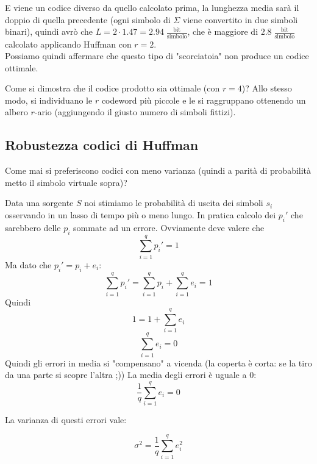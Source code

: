 E viene un codice diverso da quello calcolato prima, la lunghezza media sarà il doppio di quella precedente (ogni simbolo di $\Sigma$ viene convertito in due simboli binari), quindi avrò che $L = 2 \cdot 1.47 = 2.94 \; \frac{\text{bit}}{\text{simbolo}}$, che è maggiore di $2.8 \; \frac{\text{bit}}{\text{simbolo}}$ calcolato applicando Huffman con $r=2$.\\
Possiamo quindi affermare che questo tipo di "scorciatoia" non produce un codice ottimale.

Come si dimostra che il codice prodotto sia ottimale (con $r=4$)? Allo stesso modo, si individuano le $r$ codeword più piccole e le si raggruppano ottenendo un albero $r$-ario (aggiungendo il giusto numero di simboli fittizi).

\subsection*{Robustezza codici di Huffman}
Come mai si preferiscono codici con meno varianza (quindi a parità di probabilità metto il simbolo virtuale sopra)?

Data una sorgente $S$ noi stimiamo le probabilità di uscita dei simboli $s_i$ osservando in un lasso di tempo più o meno lungo.
In pratica calcolo dei $p_i'$ che sarebbero delle $p_i$ sommate ad un errore.
Ovviamente deve valere che 
\begin{equation*}
\sum_{i=1}^qp_i'=1
\end{equation*}
Ma dato che $p_i'=p_i+e_i$:
\begin{equation*}
\sum_{i=1}^qp_i'= \sum_{i=1}^qp_i + \sum_{i=1}^qe_i = 1
\end{equation*}
Quindi
\begin{equation*}
1=1 + \sum_{i=1}^qe_i
\end{equation*}
\begin{equation}
\sum_{i=1}^qe_i = 0 
\end{equation}
Quindi gli errori in media si "compensano" a vicenda (la coperta è corta: se la tiro da una parte si scopre l'altra ;))
La media degli errori è uguale a 0:
\begin{equation}
\frac{1}{q}\sum_{i=1}^qe_i = 0 
\end{equation}


La varianza di questi errori vale:

\begin{equation}
\sigma^2 = \frac{1}{q}\sum_{i=1}^qe_i^2
\end{equation}

